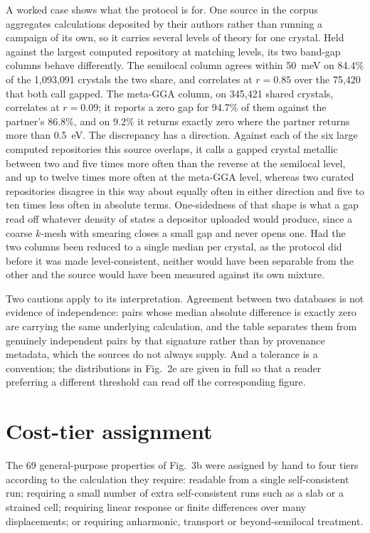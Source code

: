 A worked case shows what the protocol is for. One source in the corpus
aggregates calculations deposited by their authors rather than running a campaign
of its own, so it carries several levels of theory for one crystal. Held against
the largest computed repository at matching levels, its two band-gap columns
behave differently. The semilocal column agrees within 50~meV on 84.4\% of the
1{,}093{,}091 crystals the two share, and correlates at $r=0.85$ over the
75{,}420 that both call gapped. The meta-GGA column, on 345{,}421 shared
crystals, correlates at $r=0.09$; it reports a zero gap for 94.7\% of them against
the partner's 86.8\%, and on 9.2\% it returns exactly zero where the partner
returns more than 0.5~eV. The discrepancy has a direction. Against each of the six
large computed repositories this source overlaps, it calls a gapped crystal
metallic between two and five times more often than the reverse at the semilocal
level, and up to twelve times more often at the meta-GGA level, whereas two
curated repositories disagree in this way about equally often in either direction
and five to ten times less often in absolute terms. One-sidedness of that shape is
what a gap read off whatever density of states a depositor uploaded would produce,
since a coarse $k$-mesh with smearing closes a small gap and never opens one. Had
the two columns been reduced to a single median per crystal, as the protocol did
before it was made level-consistent, neither would have been separable from the
other and the source would have been measured against its own mixture.

Two cautions apply to its interpretation. Agreement between two databases is not
evidence of independence: pairs whose median absolute difference is exactly zero
are carrying the same underlying calculation, and the table separates them from
genuinely independent pairs by that signature rather than by provenance metadata,
which the sources do not always supply. And a tolerance is a convention; the
distributions in Fig.~2e are given in full so that a reader preferring a different
threshold can read off the corresponding figure.

\section{Cost-tier assignment}\label{note:tiers}

The 69 general-purpose properties of Fig.~3b were assigned by hand to four tiers
according to the calculation they require: readable from a single self-consistent
run; requiring a small number of extra self-consistent runs such as a slab or a
strained cell; requiring linear response or finite differences over many
displacements; or requiring anharmonic, transport or beyond-semilocal treatment.

